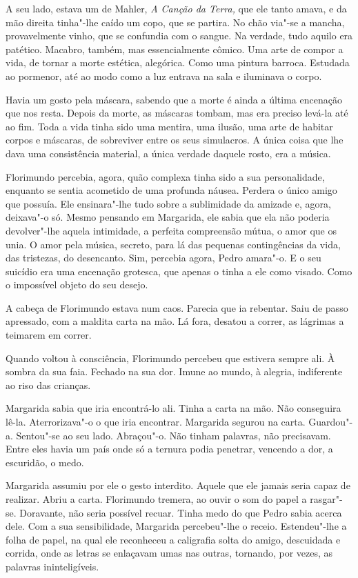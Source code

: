 A seu lado, estava um  de Mahler, \emph{A Canção da Terra, }que ele
tanto amava, e da mão direita tinha"-lhe caído um copo, que se partira.
No chão via"-se a mancha, provavelmente vinho, que se confundia com o
sangue. Na verdade, tudo aquilo era patético. Macabro, também, mas
essencialmente cômico. Uma arte de compor a vida, de tornar a morte
estética, alegórica. Como uma pintura barroca. Estudada ao pormenor, até
ao modo como a luz entrava na sala e iluminava o corpo.

Havia um gosto pela máscara, sabendo que a morte é ainda a última
encenação que nos resta. Depois da morte, as máscaras tombam, mas era
preciso levá-la até ao fim. Toda a vida tinha sido uma mentira, uma
ilusão, uma arte de habitar corpos e máscaras, de sobreviver entre os
seus simulacros. A única coisa que lhe dava uma consistência material, a
única verdade daquele rosto, era a música.

Florimundo percebia, agora, quão complexa tinha sido a sua
personalidade, enquanto se sentia acometido de uma profunda náusea.
Perdera o único amigo que possuía. Ele ensinara"-lhe tudo sobre a
sublimidade da amizade e, agora, deixava"-o só. Mesmo pensando em
Margarida, ele sabia que ela não poderia devolver"-lhe aquela intimidade,
a perfeita compreensão mútua, o amor que os unia. O amor pela música,
secreto, para lá das pequenas contingências da vida, das tristezas, do
desencanto. Sim, percebia agora, Pedro amara"-o. E o seu suicídio era uma
encenação grotesca, que apenas o tinha a ele como visado. Como o
impossível objeto do seu desejo.

A cabeça de Florimundo estava num caos. Parecia que ia rebentar. Saiu de
passo apressado, com a maldita carta na mão. Lá fora, desatou a correr,
as lágrimas a teimarem em correr.

Quando voltou à consciência, Florimundo percebeu que estivera sempre
ali. À sombra da sua faia. Fechado na sua dor. Imune ao mundo, à
alegria, indiferente ao riso das crianças.

Margarida sabia que iria encontrá-lo ali. Tinha a carta na mão. Não
conseguira lê-la. Aterrorizava"-o o que iria encontrar. Margarida segurou
na carta. Guardou"-a. Sentou"-se ao seu lado. Abraçou"-o. Não tinham
palavras, não precisavam. Entre eles havia um país onde só a ternura
podia penetrar, vencendo a dor, a escuridão, o medo.

Margarida assumiu por ele o gesto interdito. Aquele que ele jamais seria
capaz de realizar. Abriu a carta. Florimundo tremera, ao ouvir o som do
papel a rasgar"-se. Doravante, não seria possível recuar. Tinha medo do
que Pedro sabia acerca dele. Com a sua sensibilidade, Margarida
percebeu"-lhe o receio. Estendeu"-lhe a folha de papel, na qual ele
reconheceu a caligrafia solta do amigo, descuidada e corrida, onde as
letras se enlaçavam umas nas outras, tornando, por vezes, as palavras
ininteligíveis.

